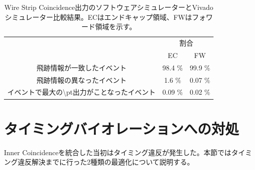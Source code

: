 \begin{table}[]
    \centering
    \caption{Wire Strip Coincidence出力のソフトウェアシミュレーターとVivadoシミュレーター比較結果。ECはエンドキャップ領域、FWはフォワード領域を示す。\cite{mt_kawamoto}}
    \label{tab:Vivado_WS}
    \begin{tabular}{|c|cc|}
    \hline
    \multirow{2}{*}{}                      & \multicolumn{2}{c|}{割合}                \\ \cline{2-3} 
                                           & \multicolumn{1}{c|}{EC}      & FW      \\ \hline\hline
    飛跡情報が一致したイベント                          & \multicolumn{1}{c|}{98.4 \%} & 99.9 \% \\ \hline
    飛跡情報の異なったイベント                          & \multicolumn{1}{c|}{1.6 \%}  & 0.07 \% \\ \hline
    イベントで最大の\textbackslash{}pt出力がことなったイベント & \multicolumn{1}{c|}{0.09 \%} & 0.02 \% \\ \hline
    \end{tabular}
\end{table}



\clearpage


\section{タイミングバイオレーションへの対処}
\label{sec:appendix:timing_violation}
Inner Coincidenceを統合した当初はタイミング違反が発生した。本節ではタイミング違反解決までに行った2種類の最適化について説明する。


